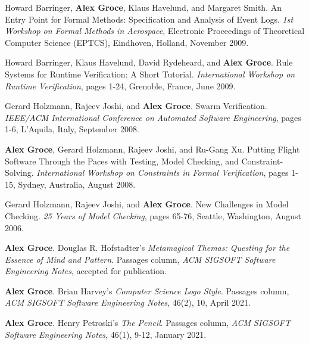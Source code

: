 \documentclass[ComputerScience]{vita}
\begin{document}
\begin{vita}
\begin{Invited Papers}
\item Howard Barringer, {\bf Alex Groce}, Klaus Havelund, and Margaret Smith.
\newblock An Entry Point for Formal Methods:  Specification and Analysis of Event Logs.
\newblock \emph{1st Workshop on Formal Methods in Aerospace}, Electronic Proceedings of Theoretical Computer Science (EPTCS), Eindhoven, Holland, November 2009.

\item Howard Barringer, Klaus Havelund, David Rydeheard, and {\bf Alex Groce}.
\newblock Rule Systems for Runtime Verification: A Short Tutorial.
\newblock \emph{International Workshop on Runtime Verification}, pages 1-24, Grenoble, France, June 2009.

\item Gerard Holzmann, Rajeev Joshi, and {\bf Alex Groce}.
\newblock Swarm Verification.
\newblock \emph{IEEE/ACM International Conference on Automated Software Engineering}, pages 1-6, L'Aquila, Italy, September 2008.

\item {\bf Alex Groce}, Gerard Holzmann, Rajeev Joshi, and Ru-Gang Xu.
\newblock Putting Flight Software Through the Paces with Testing, Model Checking, and Constraint-Solving.
\newblock \emph{International Workshop on Constraints in Formal Verification}, pages 1-15, Sydney, Australia, August 2008.

\item
Gerard Holzmann, Rajeev Joshi, and {\bf Alex Groce}.
\newblock New Challenges in Model Checking.
\newblock \emph
{25 Years of Model Checking}, pages 65-76, Seattle, Washington, August 2006.
\end{Invited Papers}

\begin{Columns, Book Reviews, and Magazine Articles}
\item {\bf Alex Groce}. 
\newblock Douglas R. Hofstadter's \emph{Metamagical Themas: Questing for the Essence of Mind and Pattern}. 
\newblock Passages column, \emph{ACM SIGSOFT Software Engineering 
  Notes}, accepted for publication.
  
\item {\bf Alex Groce}. 
\newblock Brian Harvey's \emph{Computer Science Logo Style}. 
\newblock Passages column, \emph{ACM SIGSOFT Software Engineering 
  Notes}, 46(2), 10, April 2021.

\item {\bf Alex Groce}. 
\newblock Henry Petroski's \emph{The Pencil}. 
\newblock Passages column, \emph{ACM SIGSOFT Software Engineering 
  Notes}, 46(1), 9-12, January 2021.
  

\end{Columns, Book Reviews, and Magazine Articles}
\end{vita}
\end{document}
